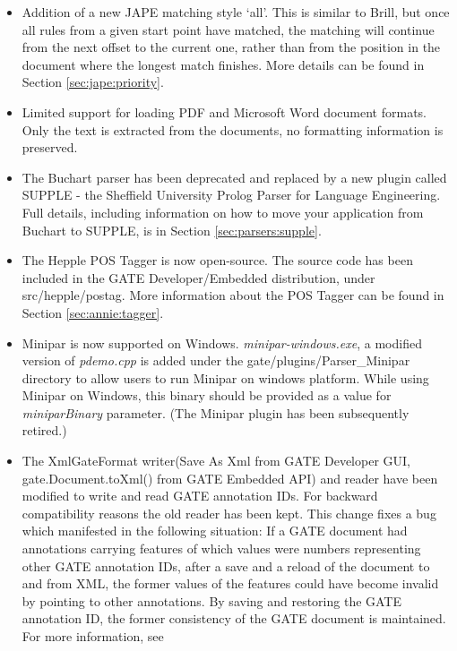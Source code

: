 \begin{itemize}
\item Addition of a new JAPE matching style `all'. This is similar to Brill,
  but once all rules from a given start point have matched, the matching will
  continue from the next offset to the current one, rather than from the
  position in the document where the longest match finishes. More details can
  be found in Section \ref{sec:jape:priority}.
\item Limited support for loading PDF and Microsoft Word document formats.
  Only the text is extracted from the documents, no formatting information is
  preserved.
\item The Buchart parser has been deprecated and replaced by a new plugin
  called SUPPLE - the Sheffield University Prolog Parser for Language
  Engineering.  Full details, including information on how to move your
  application from Buchart to SUPPLE, is in Section
  \ref{sec:parsers:supple}.
\item The Hepple POS Tagger is now open-source.  The source code has been
  included in the GATE Developer/Embedded distribution, under
  src/hepple/postag. More information about the POS Tagger can be
  found in Section \ref{sec:annie:tagger}.
\item Minipar is now supported on Windows.  \textit{minipar-windows.exe}, a
  modified version of \textit{pdemo.cpp} is added under the
  gate/plugins/Parser\_Minipar directory to allow users to run Minipar on
  windows platform. While using Minipar on Windows, this binary should be
  provided as a value for \textit{miniparBinary} parameter.  (The Minipar plugin
  has been subsequently retired.)
\item The XmlGateFormat writer(Save As Xml from GATE Developer GUI, gate.Document.toXml()
  from GATE Embedded API) and reader have been modified to write and read GATE
  annotation IDs. For backward compatibility reasons the old reader
  has been kept. This change fixes a bug which manifested in the
  following situation: If a GATE document had annotations carrying
  features of which values were numbers representing other GATE
  annotation IDs, after a save and a reload of the document to and
  from XML, the former values of the features could have become
  invalid by pointing to other annotations. By saving and restoring
  the GATE annotation ID, the former consistency of the GATE document
  is maintained. For more information, see

\end{itemize}
